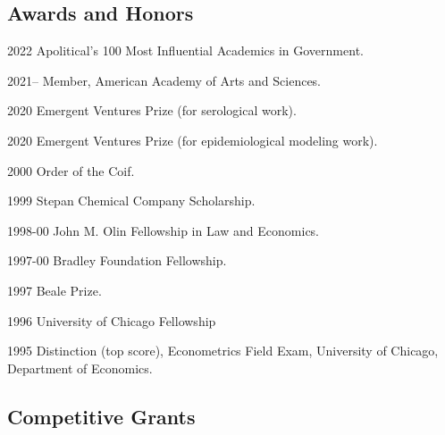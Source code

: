\documentclass[11pt,letterpaper]{report}
\begin{document}
    \subsection*{Awards and Honors}

    \begin{tablist}

        \item[2022] \tab{}Apolitical’s 100 Most Influential Academics in Government.
        \item[2021--] \tab{}Member, American Academy of Arts and Sciences.
        \item[2020] \tab{}Emergent Ventures Prize (for serological work).
        \item[2020] \tab{}Emergent Ventures Prize (for epidemiological modeling work).
        \item[2000] \tab{}Order of the Coif.
        \item[1999] \tab{}Stepan Chemical Company Scholarship.
        \item[1998-00] \tab{}John M. Olin Fellowship in Law and Economics.
        \item[1997-00] \tab{}Bradley Foundation Fellowship.
        \item[1997] \tab{}Beale Prize. 
        \item[1996] \tab{}University of Chicago Fellowship
        \item[1995] \tab{}Distinction (top score), Econometrics Field Exam, University of Chicago, Department of Economics. 
        
    \end{tablist}

    \subsection*{Competitive Grants}
\end{document}
